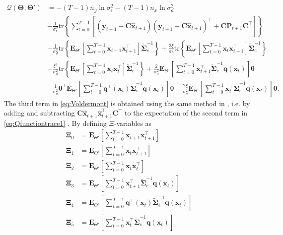 \documentclass[]{article}
\begin{document}
\begin{align}\label{eq:Voldermont}
 \mathcal Q(\boldsymbol \Theta,\boldsymbol\Theta')&=-(T-1)n_y\ln \sigma_{\epsilon}^2-(T-1)n_x\ln\sigma_d^2\nonumber \\
& -\frac{1}{\sigma_{\epsilon}^2}\mathrm{tr}\left\lbrace\boldsymbol\sum_{t=0}^{T-1}\left[ (\mathbf y_{t+1}-\mathbf C\mathbf{\hat{x}}_{t+1}) (\mathbf y_{t+1}-\mathbf C\mathbf{\hat{x}}_{t+1})^\top+\mathbf C \mathbf P_{t+1}\mathbf C^\top\right] \right\rbrace\nonumber \\
&-\frac{1}{\sigma_d^2}\mathrm{tr}\left\lbrace \mathbf E_{\Theta'}\left[\sum_{t=0}^{T-1}\mathbf x_{t+1}\mathbf x_{t+1}^\top\right]\tilde{\boldsymbol\Sigma}_e^{-1}\right\rbrace+\frac{2\xi}{\sigma_d^2} \mathrm{tr}\left\lbrace \mathbf E_{\Theta'}\left[\sum_{t=0}^{T-1}\mathbf x_t\mathbf x_{t+1}^\top\right] \tilde{\boldsymbol\Sigma}_e^{-1}\right\rbrace \nonumber \\
&-\frac{\xi^2}{\sigma_d^2}\mathrm{tr} \left\lbrace\mathbf E_{\Theta'}\left[\sum_{t=0}^{T-1}\mathbf x_t\mathbf x_{t}^\top\right]\tilde{\boldsymbol\Sigma}_e^{-1} \right\rbrace +\frac{2}{\sigma_d^2}\mathbf E_{\Theta'}\left[\sum_{t=0}^{T-1}\mathbf x_{t+1}^\top\tilde{\boldsymbol\Sigma}_e^{-1}\mathbf q( \mathbf x_t)\right]\boldsymbol\theta
 \nonumber \\
&-\frac{1}{\sigma_d^2}\boldsymbol\theta^\top \mathbf E_{\Theta'}\left[\sum_{t=0}^{T-1}  \mathbf q^\top(\mathbf  x_t)\tilde{\boldsymbol\Sigma}_e^{-1}\mathbf q(\mathbf x_t)\right]\boldsymbol\theta-\frac{2\xi}{\sigma_d^2} \mathbf E_{\Theta'}\left[\sum_{t=0}^{T-1} \mathbf x_t^\top\tilde{\boldsymbol\Sigma}_e^{-1}\mathbf q(\mathbf x_t)  \right] \boldsymbol\theta.
\end{align}
The third term in \eqref{eq:Voldermont} is obtained using the same method in \cite{Shumway2000}, i.e. by adding and subtracting $\mathbf C \mathbf{\hat{x}}_{t+1} \mathbf{\hat{x}}_{t+1}^\top \mathbf C^\top$ to the expectation of the second term in \eqref{eq:Qfunctiontrace1} . By defining $\Xi$-variables as 
\begin{align}
	\boldsymbol\Xi_{0}&=\mathbf E_{\Theta'}\left[\sum_{t=0}^{T-1}\mathbf x_{t+1}\mathbf x_{t+1}^\top\right]\label{eq:defofXi0} \\
\boldsymbol\Xi_{1}&=\mathbf E_{\Theta'}\left[\sum_{t=0}^{T-1}\mathbf x_t\mathbf x_{t+1}^\top\right]\label{eq:defofXi1} \\
\boldsymbol\Xi_{2}&=\mathbf E_{\Theta'}\left[\sum_{t=0}^{T-1}\mathbf x_t\mathbf x_{t}^\top\right]\label{eq:defofXi2}\\
\boldsymbol\Xi_{3}&=\mathbf E_{\Theta'}\left[\sum_{t=0}^{T-1}\mathbf x_{t+1}^\top\tilde{\boldsymbol\Sigma}_e^{-1}\mathbf q( \mathbf x_t)\right] \label{eq:defofXi3} \\	
\boldsymbol\Xi_{4}&= \mathbf E_{\Theta'}\left[\sum_{t=0}^{T-1}  \mathbf q^\top(\mathbf  x_t)\tilde{\boldsymbol\Sigma}_e^{-1} \mathbf q(\mathbf x_t)\right] \label{eq:defofXi4}\\
 \boldsymbol\Xi_{5}&=\mathbf E_{\Theta'}\left[\sum_{t=0}^{T-1} \mathbf x_t^\top\tilde{\boldsymbol\Sigma}_e^{-1}\mathbf q(\mathbf x_t)  \right] \label{eq:defofXi5}
 \end{align}
\end{document}
